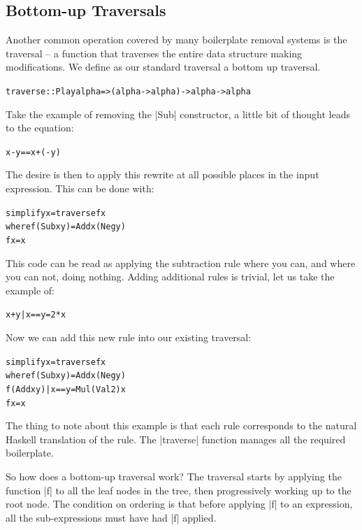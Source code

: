\documentclass[preprint]{sigplanconf}
\newenvironment{code}{\begin{alltt}\small}{\end{alltt}}
\begin{document}
\subsection{Bottom-up Traversals}

Another common operation covered by many boilerplate removal systems is the traversal -- a function that traverses the entire data structure making modifications. We define as our standard traversal a bottom up traversal.

\begin{code}
traverse :: Play alpha => (alpha -> alpha) -> alpha -> alpha
\end{code}

Take the example of removing the |Sub| constructor, a little bit of thought leads to the equation:

\begin{code}
x - y == x + (- y)
\end{code}

The desire is then to apply this rewrite at all possible places in the input expression. This can be done with:

\begin{code}
simplify x = traverse f x
    where  f (Sub x y)  = Add x (Neg y)
           f x          = x
\end{code}

This code can be read as applying the subtraction rule where you can, and where you can not, doing nothing. Adding additional rules is trivial, let us take the example of:

\begin{code}
x + y | x == y = 2 * x
\end{code}

Now we can add this new rule into our existing traversal:

\begin{code}
simplify x = traverse f x
    where  f (Sub x y)           = Add x (Neg y)
           f (Add x y) | x == y  = Mul (Val 2) x
           f x                   = x
\end{code}

The thing to note about this example is that each rule corresponds to the natural Haskell translation of the rule. The |traverse| function manages all the required boilerplate.

So how does a bottom-up traversal work? The traversal starts by applying the function |f| to all the leaf nodes in the tree, then progressively working up to the root node. The condition on ordering is that before applying |f| to an expression, all the sub-expressions must have had |f| applied.
\end{document}
